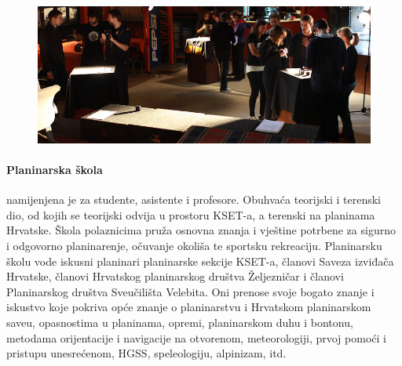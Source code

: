\documentclass[12pt,a4paper,oneside]{article}
\begin{document}
	\begin{figure}[h!]
		\centering
		\vspace{5mm}
		\includegraphics[scale=0.55]{fotoradionica.jpg}	
	\end{figure}
	
	\paragraph{Planinarska škola} namijenjena je za studente, asistente i profesore. Obuhvaća teorijski i terenski dio, od kojih se teorijski odvija u prostoru KSET-a, a terenski na planinama Hrvatske. Škola polaznicima pruža osnovna znanja i vještine potrbene za sigurno i odgovorno planinarenje, očuvanje okoliša te sportsku rekreaciju. Planinarsku školu vode iskusni planinari planinarske sekcije KSET-a, članovi Saveza izviđača Hrvatske, članovi Hrvatskog planinarskog društva Željezničar i članovi Planinarskog društva Sveučilišta Velebita. Oni prenose svoje bogato znanje i iskustvo koje pokriva opće znanje o planinarstvu i Hrvatskom planinarskom saveu, opasnostima u planinama, opremi, planinarskom duhu i bontonu, metodama orijentacije i navigacije na otvorenom, meteorologiji, prvoj pomoći i pristupu unesrećenom, HGSS, speleologiju, alpinizam, itd.
	
\end{document}
